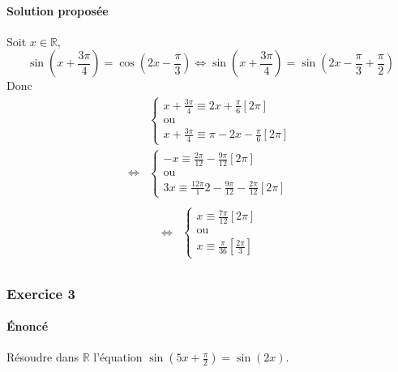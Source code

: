 \documentclass[14pt]{article}
\newcommand{\pr}[1]{\left(#1\right)}
\def\R{\mathbb R}
\def\ssi{\Leftrightarrow}
\def\Ssi{\Longleftrightarrow}
\begin{document}
    \paragraph{Solution proposée} Soit $x\in\R$, \[\sin\pr{x+\frac{3\pi}4}=\cos\pr{2x-\frac\pi3}\ssi \sin\pr{x+\frac{3\pi}4}=\sin\pr{2x-\frac\pi3+\frac\pi2}\]
    Donc
    \begin{align*}
        &\begin{cases}x+\frac{3\pi}4\equiv 2x+\frac\pi6[2\pi]\\ \text{ou}\\x+\frac{3\pi}4\equiv\pi- 2x-\frac\pi6[2\pi] \end{cases}\\
        \Ssi&\begin{cases}-x\equiv\frac{2\pi}{12}-\frac{9\pi}{12}[2\pi]\\ \text{ou}\\3x\equiv\frac{12\pi}12-\frac{9\pi}{12}-\frac{2\pi}{12}[2\pi] \end{cases}\\
    \end{align*}
    \newpage
    \begin{align*}
        \Ssi&\begin{cases}x\equiv\frac{7\pi}{12}[2\pi]\\ \text{ou}\\x\equiv\frac\pi{36}\left[\frac{2\pi}3\right] \end{cases}\\
    \end{align*}

    \subsubsection*{Exercice 3}
    \paragraph{Énoncé} Résoudre dans $\R$ l'équation $\sin\pr{5x+\frac\pi2}=\sin(2x)$.
\end{document}
